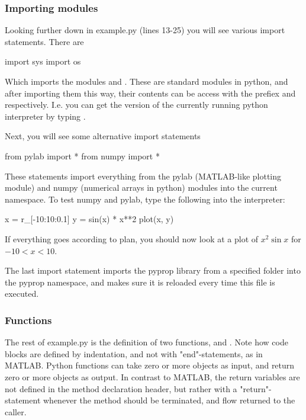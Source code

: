 \subsubsection*{Importing modules}
Looking further down in example.py (lines 13-25) you will see various import statements. There are
\begin{python}
	import sys
	import os
\end{python}
Which imports the modules  and . These are standard modules in python, and after importing them this
way, their contents can be access with the prefiex  and  respectively. I.e. you can get the version
of the currently running python interpreter by typing .

Next, you will see some alternative import statements
\begin{python}
	from pylab import *
	from numpy import *
\end{python}
These statements import everything from the pylab (MATLAB-like plotting module) and numpy (numerical arrays in python)
modules into the current namespace. To test numpy and pylab, type the following into the interpreter:
\begin{python}
	x = r_[-10:10:0.1]
	y = sin(x) * x**2
	plot(x, y)
\end{python}
If everything goes according to plan, you should now look at a plot of $x^2 \sin x $ for $-10 < x < 10$.

The last import statement imports the pyprop library from a specified folder into the pyprop namespace, and makes sure 
it is reloaded every time this file is executed.

\subsubsection*{Functions}
The rest of example.py is the definition of two functions,  and . 
Note how code blocks are defined by indentation, and not with "end"-statements, as in MATLAB. 
Python functions can take zero or more objects
as input, and return zero or more objects as output. In contrast to MATLAB, the return variables are not defined in the
method declaration header, but rather with a "return"-statement whenever the method should be terminated, and flow returned
to the caller. 

